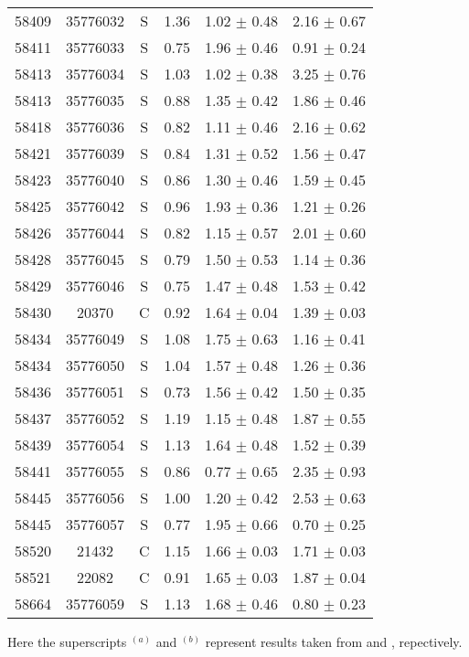 \begin{longtable*}[c]{cccccc}
    58409 & 35776032 & S     & 1.36  & 1.02  $\pm$ 0.48  & 2.16  $\pm$ 0.67 \\
    58411 & 35776033 & S     & 0.75  & 1.96  $\pm$ 0.46  & 0.91  $\pm$ 0.24 \\
    58413 & 35776034 & S     & 1.03  & 1.02  $\pm$ 0.38  & 3.25  $\pm$ 0.76 \\
    58413 & 35776035 & S     & 0.88  & 1.35  $\pm$ 0.42  & 1.86  $\pm$ 0.46 \\
    58418 & 35776036 & S     & 0.82  & 1.11  $\pm$ 0.46  & 2.16  $\pm$ 0.62 \\
    58421 & 35776039 & S     & 0.84  & 1.31  $\pm$ 0.52  & 1.56  $\pm$ 0.47 \\
    58423 & 35776040 & S     & 0.86  & 1.30  $\pm$ 0.46  & 1.59  $\pm$ 0.45 \\
    58425 & 35776042 & S     & 0.96  & 1.93  $\pm$ 0.36  & 1.21  $\pm$ 0.26 \\
    58426 & 35776044 & S     & 0.82  & 1.15  $\pm$ 0.57  & 2.01  $\pm$ 0.60 \\
    58428 & 35776045 & S     & 0.79  & 1.50  $\pm$ 0.53  & 1.14  $\pm$ 0.36 \\
    58429 & 35776046 & S     & 0.75  & 1.47  $\pm$ 0.48  & 1.53  $\pm$ 0.42 \\
    58430 & 20370 & C     & 0.92  & 1.64  $\pm$ 0.04  & 1.39  $\pm$ 0.03 \\
    58434 & 35776049 & S     & 1.08  & 1.75  $\pm$ 0.63  & 1.16  $\pm$ 0.41 \\
    58434 & 35776050 & S     & 1.04  & 1.57  $\pm$ 0.48  & 1.26  $\pm$ 0.36 \\
    58436 & 35776051 & S     & 0.73  & 1.56  $\pm$ 0.42  & 1.50  $\pm$ 0.35 \\
    58437 & 35776052 & S     & 1.19  & 1.15  $\pm$ 0.48  & 1.87  $\pm$ 0.55 \\
    58439 & 35776054 & S     & 1.13  & 1.64  $\pm$ 0.48  & 1.52  $\pm$ 0.39 \\
    58441 & 35776055 & S     & 0.86  & 0.77  $\pm$ 0.65  & 2.35  $\pm$ 0.93 \\
    58445 & 35776056 & S     & 1.00  & 1.20  $\pm$ 0.42  & 2.53  $\pm$ 0.63 \\
    58445 & 35776057 & S     & 0.77  & 1.95  $\pm$ 0.66  & 0.70  $\pm$ 0.25 \\
    58520 & 21432 & C     & 1.15  & 1.66  $\pm$ 0.03  & 1.71  $\pm$ 0.03 \\
    58521 & 22082 & C     & 0.91  & 1.65  $\pm$ 0.03  & 1.87  $\pm$ 0.04 \\
    58664 & 35776059 & S     & 1.13  & 1.68  $\pm$ 0.46  & 0.80  $\pm$ 0.23 \\
\hline
\end{longtable*}

Here the superscripts $^{(a)}$ and $^{(b)}$ represent results taken from \citet{2012ApJ...745..107W}  and \citet{2016A&A...593L...9H}, repectively.



